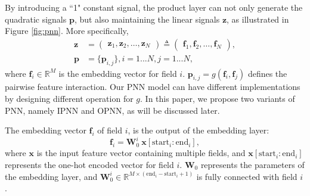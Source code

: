 \documentclass[conference]{IEEEtran}
\newcommand{\bs}{\boldsymbol}
\newcommand{\bW}{\bs{W}}
\newcommand{\bz}{\bs{z}}
\newcommand{\bp}{\bs{p}}
\newcommand{\bx}{\bs{x}}
\newcommand{\Bf}{\bs{f}}
\newcommand{\mR}{\mathbb{R}}
\begin{document}
By introducing a ``1" constant signal, the product layer can not only generate the quadratic signals $\bp$, but also maintaining the linear signals $\bz$, as illustrated in Figure \ref{fig:pnn}. More specifically,
\begin{align}
\bz &= \begin{pmatrix}
\bz_1, \bz_2, \ldots, \bz_N
\end{pmatrix}
\triangleq \begin{pmatrix}
\Bf_1, \Bf_2, \ldots, \Bf_N
\end{pmatrix}, \\
\bp	&=
\{
\bp_{i, j}
\}, i = 1...N, j = 1...N,
\end{align}
where $\Bf_i \in \mathbb{R}^M$ is the embedding vector for field $i$. $\bp_{i, j} = g(\Bf_i, \Bf_j)$ defines the pairwise feature interaction.
Our PNN model can have different implementations by designing different operation for $g$. In this paper, we propose two variants of PNN, namely IPNN and OPNN, as will be discussed later.

The embedding vector $\Bf_i$ of field $i$, is the output of the embedding layer:
\begin{equation}
\Bf_i = \bW_0^i~\bx[\text{start}_i : \text{end}_i],
\end{equation}
where $\bx$ is the input feature vector containing multiple fields, and $\bx[\text{start}_i : \text{end}_i]$ represents the one-hot encoded vector for field $i$. $\bW_0$ represents the parameters of the embedding layer, and $\bW_0^i \in \mR^{M \times (\text{end}_i - \text{start}_i + 1)}$ is fully connected with field $i$.
\end{document}
